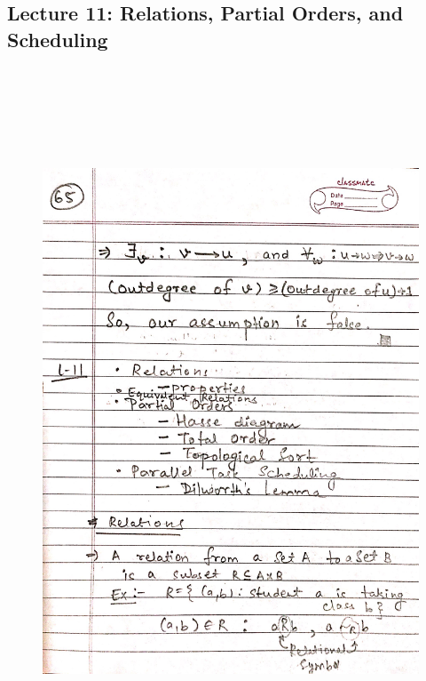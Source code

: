 \newpage
{\color{black} \subsection*{Lecture 11: Relations, Partial Orders, and Scheduling}}
\begin{figure}[H]
    \centering
    \includegraphics[width=16cm, height=21cm]{"./MIT-6.042J/MIT-6042J-065"}
\end{figure}


